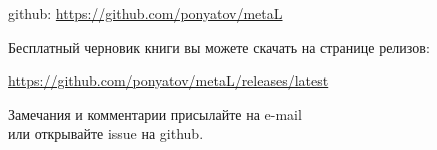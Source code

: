 \clearpage
{}\secdown

github: \url{https://github.com/ponyatov/metaL}

\bigskip

Бесплатный черновик книги вы можете скачать на странице релизов:

\url{https://github.com/ponyatov/metaL/releases/latest}

\bigskip\noindent
Замечания и комментарии присылайте на e-mail\\или открывайте issue на github.






\secup
